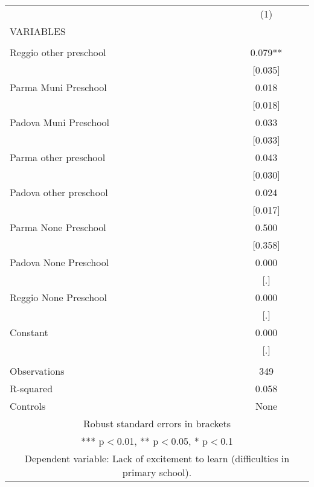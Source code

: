 \begin{tabular}{lc} \hline
 & (1) \\
VARIABLES &  \\ \hline
 &  \\
Reggio other preschool & 0.079** \\
 & [0.035] \\
Parma Muni Preschool & 0.018 \\
 & [0.018] \\
Padova Muni Preschool & 0.033 \\
 & [0.033] \\
Parma other preschool & 0.043 \\
 & [0.030] \\
Padova other preschool & 0.024 \\
 & [0.017] \\
Parma None Preschool & 0.500 \\
 & [0.358] \\
Padova None Preschool & 0.000 \\
 & [.] \\
Reggio None Preschool & 0.000 \\
 & [.] \\
Constant & 0.000 \\
 & [.] \\
 &  \\
Observations & 349 \\
R-squared & 0.058 \\
 Controls & None \\ \hline
\multicolumn{2}{c}{ Robust standard errors in brackets} \\
\multicolumn{2}{c}{ *** p$<$0.01, ** p$<$0.05, * p$<$0.1} \\
\multicolumn{2}{c}{ Dependent variable: Lack of excitement to learn (difficulties in primary school).} \\
\end{tabular}
